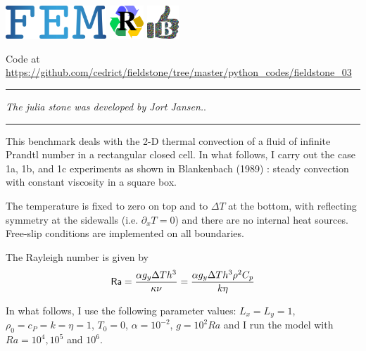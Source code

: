 \includegraphics[height=1.25cm]{images/pictograms/FEM}
\includegraphics[height=1.25cm]{images/pictograms/replication}
\includegraphics[height=1.25cm]{images/pictograms/benchmark}



Code at \url{https://github.com/cedrict/fieldstone/tree/master/python_codes/fieldstone_03}

\par\noindent\rule{\textwidth}{0.4pt}

{\sl The julia stone was developed by Jort Jansen.}. 

\par\noindent\rule{\textwidth}{0.4pt}

This benchmark deals with the 2-D thermal convection of a fluid 
of infinite Prandtl number in a rectangular closed cell.
In what follows, I carry out the case 1a, 1b, and 1c experiments as shown in 
Blankenbach \etal (1989) \cite{blbc89}:
steady convection with constant viscosity in a square box.

The temperature is fixed to zero on top and to $\Delta T$ at the bottom, 
with reflecting symmetry at the sidewalls (i.e. $\partial_x T=0$) 
and there are no internal heat sources. 
Free-slip conditions are implemented on all boundaries. 

The Rayleigh number is given by
\begin{equation}
{\mathsf{Ra}} = \frac{\alpha g_y \Delta T h^3 }{\kappa \nu}
=\frac{\alpha g_y \Delta T h^3 \rho^2 C_p}{k \eta}
\end{equation}

In what follows, I use the following parameter values:  %
$L_x=L_y=1$,$\rho_0=c_P=k=\eta=1$, $T_0=0$, $\alpha=10^{-2}$, $g=10^{2}Ra$
and I run the model with $Ra=10^4,10^{5}$ and $10^6$.

